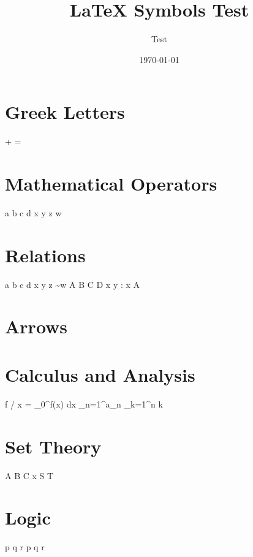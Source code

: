 \documentclass{article}
\begin{document}
\title{LaTeX Symbols Test}
\author{Test}
\date{\today}
\maketitle

\section{Greek Letters}

\alpha + \beta = \gamma
\delta \epsilon \zeta \eta \theta
\lambda \mu \nu \xi \pi \rho \sigma
\Gamma \Delta \Theta \Lambda \Xi \Pi \Sigma \Omega

\section{Mathematical Operators}

a \pm b \times c \div d
x \cdot y \ast z \star w
\oplus \ominus \otimes \oslash

\section{Relations}

a \leq b \geq c \neq d
x \approx y \equiv z \sim w
A \subset B \supset C \in D
\forall x \exists y : x \in A

\section{Arrows}

\leftarrow \rightarrow \leftrightarrow
\Leftarrow \Rightarrow \Leftrightarrow
\uparrow \downarrow \updownarrow

\section{Calculus and Analysis}

\partial f / \partial x
\nabla \cdot {} = \rho
\int_0^\infty f(x) dx
\sum_{n=1}^\infty a_n
\prod_{k=1}^n k

\section{Set Theory}

A \cap B \cup C
\emptyset \subset {}
x \in S \notin T

\section{Logic}

\neg p \land q \lor r
p \Rightarrow q \Leftrightarrow r
\end{document}
